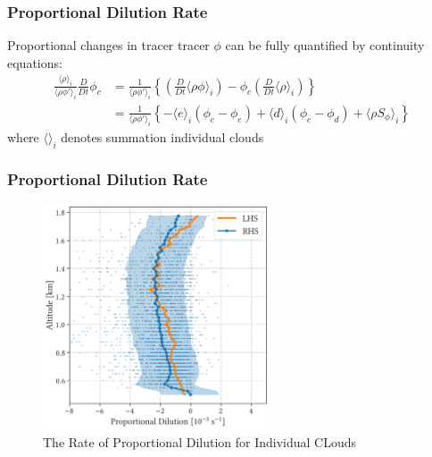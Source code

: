 \documentclass{beamer}
\begin{document}
\begin{frame}
    \frametitle{Proportional Dilution Rate}
    Proportional changes in tracer tracer $\phi$ can be fully quantified by continuity equations:
    \begin{align}
        \frac{\langle \rho \rangle _i}{\langle \rho \phi' \rangle _i} \frac{D}{D t} \phi_c
        &= \frac{1}{\langle \rho \phi' \rangle _i} \left\{ \left( \frac{D}{D t} \langle \rho \phi \rangle _i \right) - \phi_c \left( \frac{D}{D t} \langle \rho \rangle _i \right) \right\}
        \\
        &= \frac{1}{\langle \rho \phi' \rangle _i} \left\{ - \langle e \rangle _i (\phi_c - \phi_e) + \langle d \rangle _i (\phi_c - \phi_d) + \langle \rho S_\phi \rangle _i \right\}
    \end{align}
    where $\langle \rangle _i$ denotes summation individual clouds
\end{frame}

\begin{frame}
    \frametitle{Proportional Dilution Rate}
    \begin{figure}
        \centering
        \includegraphics[width=0.6\textwidth]{img/ndil.png}
        \caption{ The Rate of Proportional Dilution for Individual CLouds }
    \end{figure}
\end{frame}
\end{document}
